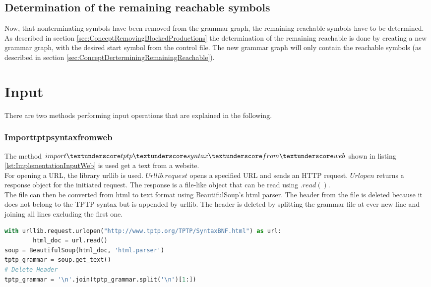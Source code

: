 \subsection{Determination of the remaining reachable symbols}
Now, that nonterminating symbols have been removed from the grammar graph, the remaining reachable symbols have to be determined.
As described in section \ref{sec:ConceptRemovingBlockedProductions} the determination of the remaining reachable is done by creating a new grammar graph, with the desired start symbol from the control file.
The new grammar graph will only contain the reachable symbols (as described in section \ref{sec:ConceptDerterminingRemainingReachable}). 

\section{Input}\label{sec:ImplementationInput}

There are two methods performing input operations that are explained in the following. 

\subsubsection{Import\textunderscore tptp\textunderscore syntax\textunderscore from\textunderscore web}
The method $import\textunderscore tptp\textunderscore syntax\textunderscore from\textunderscore web$ shown in listing \ref{lst:ImplementationInputWeb} is used get a text from a website. \\
For opening a \ac{URL}, the library urllib is used. $Urllib.request$ opens a specified \ac{URL} and sends an HTTP request. $Urlopen$ returns a response object for the initiated request. The response is a file-like object that can be read using $.read()$. \cite{urllib} \\
The file can then be converted from html to text format using BeautifulSoup's html parser.
The header from the file is deleted because it does not belong to the \ac{TPTP} syntax but is appended by urllib. The header is deleted by splitting the grammar file at ever new line and joining all lines excluding the first one. \\

\begin{lstlisting}[language=Python, basicstyle=\scriptsize	,caption= Import TPTP syntax from web,label= lst:ImplementationInputWeb]
with urllib.request.urlopen("http://www.tptp.org/TPTP/SyntaxBNF.html") as url:
        html_doc = url.read()
soup = BeautifulSoup(html_doc, 'html.parser')
tptp_grammar = soup.get_text()
# Delete Header
tptp_grammar = '\n'.join(tptp_grammar.split('\n')[1:])
\end{lstlisting}

